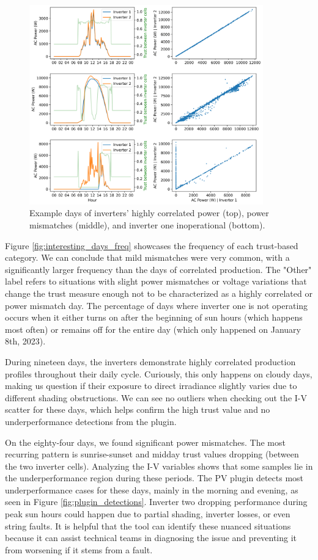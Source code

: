 \begin{figure}[h!]
    \centering
    \includegraphics[width=0.9\textwidth]{figures/chapter5/results/real/type_of_days-1.png}
    \caption{Example days of inverters' highly correlated power (top), power mismatches (middle), and inverter one inoperational (bottom).}
    \label{fig:interesting_days}
\end{figure}

Figure \ref{fig:interesting_days_freq} showcases the frequency of each trust-based category. We can conclude that mild mismatches were very common, with a significantly larger frequency than the days of correlated production. The "Other" label refers to situations with slight power mismatches or voltage variations that change the trust measure enough not to be characterized as a highly correlated or power mismatch day.
The percentage of days where inverter one is not operating occurs when it either turns on after the beginning of sun hours (which happens most often) or remains off for the entire day (which only happened on January 8th, 2023).

During nineteen days, the inverters demonstrate highly correlated production profiles throughout their daily cycle. Curiously, this only happens on cloudy days, making us question if their exposure to direct irradiance slightly varies due to different shading obstructions. We can see no outliers when checking out the I-V scatter for these days, which helps confirm the high trust value and no underperformance detections from the plugin.

On the eighty-four days, we found significant power mismatches. The most recurring pattern is sunrise-sunset and midday trust values dropping (between the two inverter cells). Analyzing the I-V variables shows that some samples lie in the underperformance region during these periods. The PV plugin detects most underperformance cases for these days, mainly in the morning and evening, as seen in Figure \ref{fig:plugin_detections}. Inverter two dropping performance during peak sun hours could happen due to partial shading, inverter losses, or even string faults. It is helpful that the tool can identify these nuanced situations because it can assist technical teams in diagnosing the issue and preventing it from worsening if it stems from a fault.

